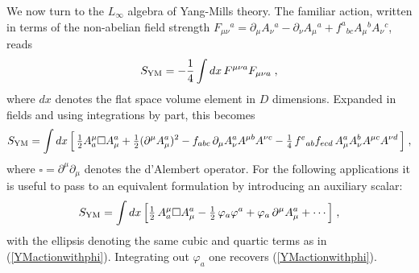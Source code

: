 \documentclass[12pt]{article}\pdfoutput=1
\def\B{\square}
\def\del{\partial}
\def\be{\begin{equation}}
\def\ee{\end{equation}}
\begin{document}
We now turn to the $L_{\infty}$ algebra of Yang-Mills theory. The familiar action,  written 
in terms of the non-abelian field strength $F_{\mu\nu}{}^a=\partial_{\mu}A_{\nu}{}^{a}-\partial_{\nu}A_{\mu}{}^{a}+f^{a}{}_{bc} 
A_{\mu}{}^{b} A_{\nu}{}^{c}$, reads 
 \be
  S_{\rm YM}  = -\frac{1}{4}\int dx\,  F^{\mu\nu  a} F_{\mu\nu a} \;, 
 \ee
where $dx$ denotes the flat space volume element in $D$ dimensions. 
Expanded in fields and  using  integrations by part, this becomes 
\begin{equation}\label{YMactionwithphi}
S_{\rm YM} =\int dx \,\Big[\,\tfrac12 A^\mu_a\B A_\mu^a+ \tfrac{1}{2} (\del^\mu A_\mu^a)^2
-f_{abc}\,\del_\mu A_\nu^a A^{\mu b}A^{\nu c}-\tfrac14\,f^e{}_{ab}f_{ecd}\,A_\mu^a A_\nu^b A^{\mu c}A^{\nu d}\, \Big]\;, 
\end{equation}
where $\B=\partial^{\mu}\partial_{\mu}$ denotes the d'Alembert operator. 
For the following applications  it is useful 
to pass to an equivalent formulation by introducing an auxiliary scalar:  
\begin{equation}\label{YMaction}
S_{\rm YM} =\int d x \,\Big[\tfrac12\,A^\mu_a\B A_\mu^a-\tfrac12\,\varphi_a\varphi^a+\varphi_a\, \del^\mu A_\mu^a
+\cdots \Big]\;,  
\end{equation}
with the ellipsis denoting the same cubic and quartic terms as in (\ref{YMactionwithphi}). 
Integrating out $\varphi_a$  one recovers (\ref{YMactionwithphi}).
\end{document}
